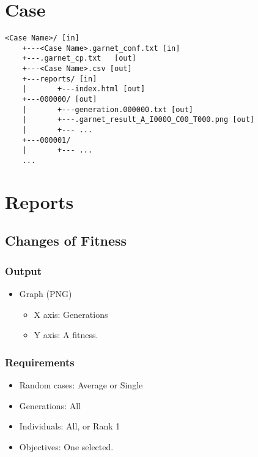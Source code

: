\documentclass[]{article}
\begin{document}
\section{Case}\label{case}

\begin{verbatim}
<Case Name>/ [in]
    +---<Case Name>.garnet_conf.txt [in]
    +---.garnet_cp.txt   [out]
    +---<Case Name>.csv [out]
    +---reports/ [in]
    |       +---index.html [out]
    +---000000/ [out]
    |       +---generation.000000.txt [out]
    |       +---.garnet_result_A_I0000_C00_T000.png [out]
    |       +--- ...
    +---000001/
    |       +--- ...
    ...
\end{verbatim}

\section{Reports}\label{reports}

\subsection{Changes of Fitness}\label{changes-of-fitness}

\subsubsection{Output}\label{output}

\begin{itemize}
\itemsep1pt\parskip0pt
\item
  Graph (PNG)

  \begin{itemize}
  \itemsep1pt\parskip0pt
  \item
    X axis: Generations
  \item
    Y axis: A fitness.
  \end{itemize}
\end{itemize}

\subsubsection{Requirements}\label{requirements}

\begin{itemize}
\itemsep1pt\parskip0pt
\item
  Random cases: Average or Single
\item
  Generations: All
\item
  Individuals: All, or Rank 1
\item
  Objectives: One selected.
\end{itemize}
\end{document}
